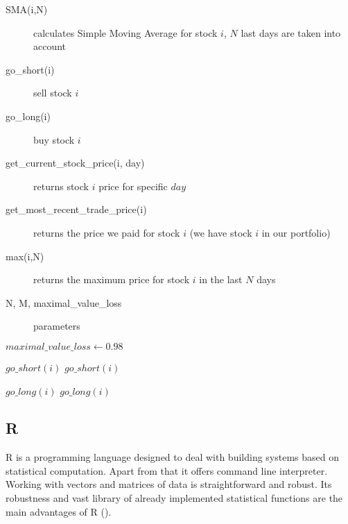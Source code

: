 \begin{description}

\item[SMA(i,N)]
  calculates Simple Moving Average for stock $i$, $N$ last days are taken into account  
\item[go\_short(i)]
  sell stock $i$
\item[go\_long(i)]
  buy stock $i$
\item[get\_current\_stock\_price(i, day)]
  returns stock $i$ price for specific $day$ 
\item[get\_most\_recent\_trade\_price(i)]
  returns the price we paid for stock $i$ (we have stock $i$ in our portfolio)
\item[max(i,N)]
  returns the maximum price for stock $i$ in the last $N$ days
\item[N, M, maximal\_value\_loss]
  parameters 
\end{description}
% 


\begin{algorithmic}

\STATE $maximal\_value\_loss \gets 0.98$



	    \STATE $go\_short(i)$
    \ELSE
		    \STATE $go\_short(i)$
	    \ENDIF
    \ENDIF

	    \STATE $go\_long(i)$
    \ELSE
		    \STATE $go\_long(i)$
	    \ENDIF
    \ENDIF

  \ENDFOR

\ENDFOR

\end{algorithmic}

\subsection{R}

R is a programming language designed to deal with building systems based on statistical computation.
Apart from that it offers command line interpreter.
Working with vectors and matrices of data is straightforward and robust.
Its robustness and vast library of already implemented statistical functions are the main advantages of R (\cite{R}).    

